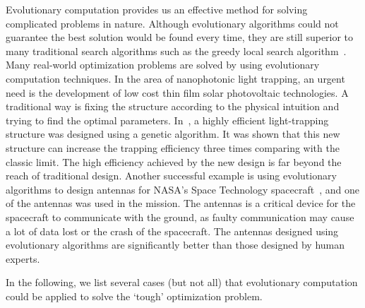 Evolutionary computation provides us an effective method for solving complicated problems in nature. Although evolutionary algorithms could not guarantee the best solution would be found every time, they are still superior to many traditional search algorithms such as the greedy local search algorithm~\cite{Gutin200281}. Many real-world optimization problems are solved by using evolutionary computation techniques. In the area of nanophotonic light trapping, an urgent need is the development of low cost thin film solar photovoltaic technologies. A traditional way is fixing the structure according to the physical intuition and trying to find the optimal parameters. In~\cite{Wang2013}, a highly efficient light-trapping structure was designed using a genetic algorithm. It was shown that this new structure can increase the trapping efficiency three times comparing with the classic limit. The high efficiency achieved by the new design is far beyond the reach of traditional design. Another successful example is using evolutionary algorithms to design antennas for NASA's Space Technology spacecraft~\cite{Hornby2011}, and one of the antennas was used in the mission. The antennas is a critical device for the spacecraft to communicate with the ground, as faulty communication may cause a lot of data lost or the crash of the spacecraft. The antennas designed using evolutionary algorithms are significantly better than those designed by human experts. %

In the following, we list several cases (but not all) that evolutionary computation could be applied to solve the `tough' optimization problem. 

